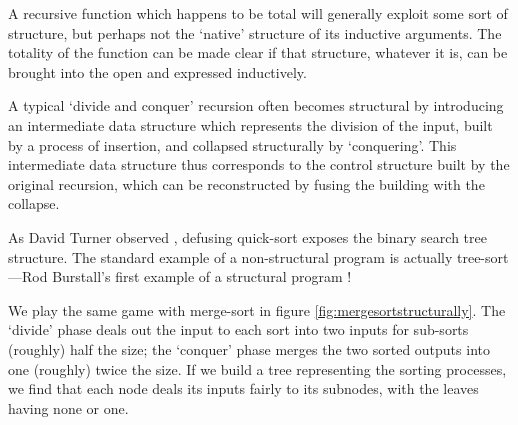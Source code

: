 \documentclass{fundam}
\begin{document}
A recursive function which happens to be total will generally exploit some
sort of structure, but perhaps not the `native' structure of its inductive
arguments. The totality of the function can be made clear if that structure,
whatever it is, can be brought into the open and expressed inductively.

A typical `divide and conquer' recursion often becomes structural by
introducing an intermediate data structure which represents the
division of the input, built by a process of insertion, and collapsed
structurally by `conquering'. This intermediate data structure thus
corresponds to the control structure built by the original recursion,
which can be reconstructed by fusing the building with the collapse.

As David Turner observed \cite{turner:strong.functional}, defusing
quick-sort exposes the binary search tree structure.  The standard
example of a non-structural program is actually tree-sort---Rod
Burstall's first example of a structural program
\cite{burstall:induction}!

We play the same game with merge-sort in figure
\ref{fig:mergesortstructurally}. The `divide' phase deals out the
input to each sort into two inputs for sub-sorts (roughly) half the
size; the `conquer' phase merges the two sorted outputs into one
(roughly) twice the size. If we build a tree representing the sorting
processes, we find that each node deals its inputs fairly to its
subnodes, with the leaves having none or one.

\newcommand{\pev}{\DC{p0}}
\newcommand{\poo}{\DC{p1}}
\end{document}
